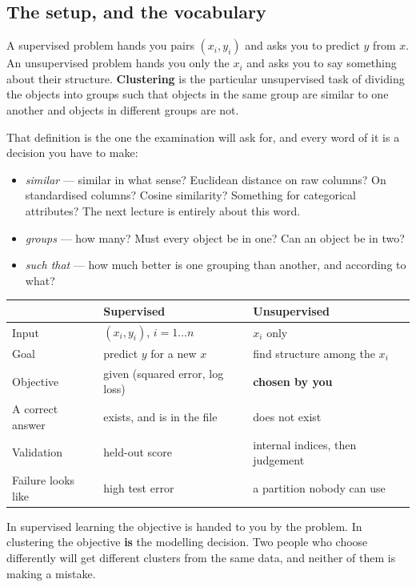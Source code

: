 \documentclass[11pt]{article}
\begin{document}
\subsection{The setup, and the vocabulary}

A supervised problem hands you pairs $(x_i, y_i)$ and asks you to predict
$y$ from $x$. An unsupervised problem hands you only the $x_i$ and asks you to
say something about their structure. \textbf{Clustering} is the particular
unsupervised task of dividing the objects into groups such that objects in the
same group are similar to one another and objects in different groups are not.

That definition is the one the examination will ask for, and every word of it
is a decision you have to make:

\begin{itemize}[leftmargin=*]
  \item \emph{similar} --- similar in what sense? Euclidean distance on raw
    columns? On standardised columns? Cosine similarity? Something for
    categorical attributes? The next lecture is entirely about this word.
  \item \emph{groups} --- how many? Must every object be in one? Can an object
    be in two?
  \item \emph{such that} --- how much better is one grouping than another, and
    according to what?
\end{itemize}

\begin{center}
\small
\begin{tabular}{@{}lll@{}}
  \toprule
  & \textbf{Supervised} & \textbf{Unsupervised} \\
  \midrule
  Input & $(x_i, y_i)$, $i = 1 \dots n$ & $x_i$ only \\
  Goal & predict $y$ for a new $x$ & find structure among the $x_i$ \\
  Objective & given (squared error, log loss) & \textbf{chosen by you} \\
  A correct answer & exists, and is in the file & does not exist \\
  Validation & held-out score & internal indices, then judgement \\
  Failure looks like & high test error & a partition nobody can use \\
  \bottomrule
\end{tabular}
\end{center}

\begin{keyidea}
In supervised learning the objective is handed to you by the problem. In
clustering the objective \textbf{is} the modelling decision. Two people who
choose differently will get different clusters from the same data, and
neither of them is making a mistake.
\end{keyidea}
\end{document}
